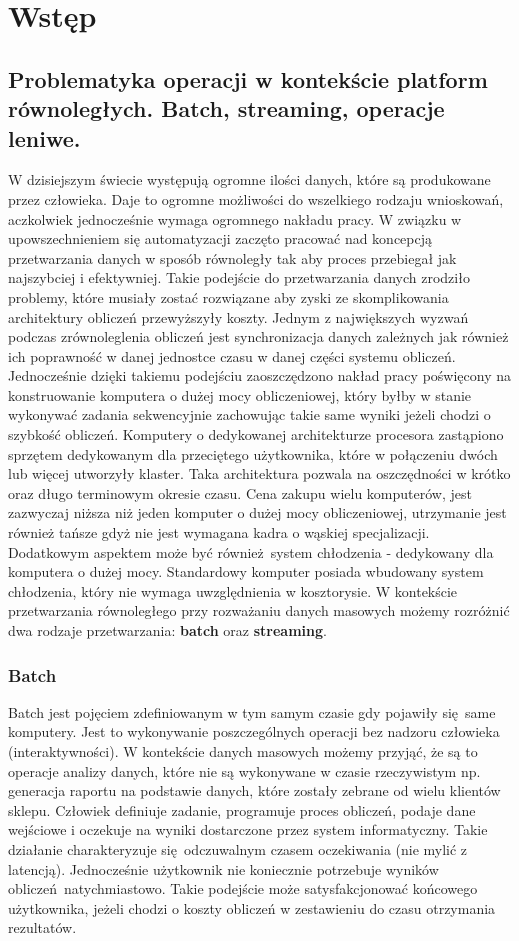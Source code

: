 \chapter{Wstęp} \label{chap.introduction}

\section{Problematyka operacji w kontekście platform równoległych. Batch, streaming, operacje leniwe.}
W dzisiejszym świecie występują ogromne ilości danych, które są produkowane przez człowieka. Daje to ogromne możliwości do wszelkiego rodzaju wnioskowań, aczkolwiek jednocześnie wymaga ogromnego nakładu pracy. W związku w upowszechnieniem się automatyzacji zaczęto pracować nad koncepcją przetwarzania danych w sposób równoległy tak aby proces przebiegał jak najszybciej i efektywniej. Takie podejście do przetwarzania danych zrodziło problemy, które musiały zostać rozwiązane aby zyski ze skomplikowania architektury obliczeń przewyższyły koszty. Jednym z największych wyzwań podczas zrównoleglenia obliczeń jest synchronizacja danych zależnych jak również ich poprawność w danej jednostce czasu w danej części systemu obliczeń. Jednocześnie dzięki takiemu podejściu zaoszczędzono nakład pracy poświęcony na konstruowanie komputera o dużej mocy obliczeniowej, który byłby w stanie wykonywać zadania sekwencyjnie zachowując takie same wyniki jeżeli chodzi o szybkość obliczeń. Komputery o dedykowanej architekturze procesora zastąpiono sprzętem dedykowanym dla przeciętego użytkownika, które w połączeniu dwóch lub więcej utworzyły klaster. Taka architektura pozwala na oszczędności w krótko oraz długo terminowym okresie czasu. Cena zakupu wielu komputerów, jest zazwyczaj niższa niż jeden komputer o dużej mocy obliczeniowej, utrzymanie jest również tańsze gdyż nie jest wymagana kadra o wąskiej specjalizacji. Dodatkowym aspektem może być również system chłodzenia - dedykowany dla komputera o dużej mocy. Standardowy komputer posiada wbudowany system chłodzenia, który nie wymaga uwzględnienia w kosztorysie. W kontekście przetwarzania równoległego przy rozważaniu danych masowych możemy rozróżnić dwa rodzaje przetwarzania: \textbf{batch} oraz \textbf{streaming}.
\subsection{Batch}\label{batch_subsection} 
Batch jest pojęciem zdefiniowanym w tym samym czasie gdy pojawiły się same komputery. Jest to wykonywanie poszczególnych operacji bez nadzoru człowieka (interaktywności). W kontekście danych masowych możemy przyjąć, że są to operacje analizy danych, które nie są wykonywane w czasie rzeczywistym np. generacja raportu na podstawie danych, które zostały zebrane od wielu klientów sklepu. Człowiek definiuje zadanie, programuje proces obliczeń, podaje dane wejściowe i oczekuje na wyniki dostarczone przez system informatyczny. Takie działanie charakteryzuje się odczuwalnym czasem oczekiwania (nie mylić z latencją). Jednocześnie użytkownik nie koniecznie potrzebuje wyników obliczeń natychmiastowo. Takie podejście może satysfakcjonować końcowego użytkownika, jeżeli chodzi o koszty obliczeń w zestawieniu do czasu otrzymania rezultatów.
